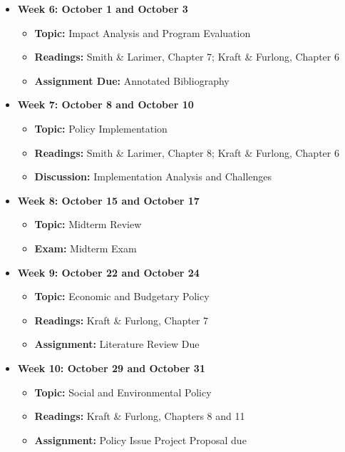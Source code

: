 \documentclass[12pt, letterpaper]{article}
\begin{document}
\begin{itemize}
    \item \textbf{Week 6: October 1 and October 3}
    \begin{itemize}
        \item \textbf{Topic:} Impact Analysis and Program Evaluation
        \item \textbf{Readings:} Smith \& Larimer, Chapter 7; Kraft \& Furlong, Chapter 6
        \item \textbf{Assignment Due:} Annotated Bibliography 
    \end{itemize}

    \item \textbf{Week 7: October 8 and October 10}
    \begin{itemize}
        \item \textbf{Topic:} Policy Implementation
        \item \textbf{Readings:} Smith \& Larimer, Chapter 8; Kraft \& Furlong, Chapter 6
        \item \textbf{Discussion:} Implementation Analysis and Challenges
    \end{itemize}

    \item \textbf{Week 8: October 15 and October 17}
    \begin{itemize}
        \item \textbf{Topic:} Midterm Review
        \item \textbf{Exam:} Midterm Exam
    \end{itemize}

    \item \textbf{Week 9: October 22 and October 24}
    \begin{itemize}
        \item \textbf{Topic:} Economic and Budgetary Policy
        \item \textbf{Readings:} Kraft \& Furlong, Chapter 7
        \item \textbf{Assignment:} Literature Review Due
    \end{itemize}

    \item \textbf{Week 10: October 29 and October 31}
    \begin{itemize}
        \item \textbf{Topic:} Social and Environmental Policy
        \item \textbf{Readings:} Kraft \& Furlong, Chapters 8 and 11
        \item \textbf{Assignment:} Policy Issue Project Proposal due
    \end{itemize}


\end{itemize}
\end{document}
